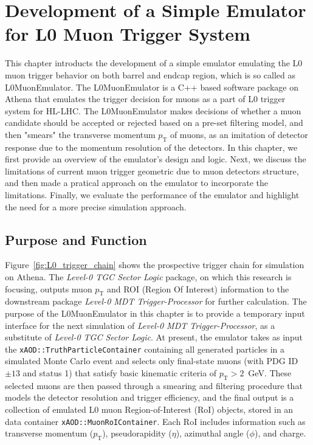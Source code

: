 \chapter{Development of a Simple Emulator for L0 Muon Trigger System} \label{ch:L0MuonEmulator}
This chapter introducts the development of a simple emulator emulating the L0 muon trigger behavior on both barrel and endcap region, which is so called as L0MuonEmulator. The L0MuonEmulator is a C++ based software package on Athena that emulates the trigger decision for muons as a part of L0 trigger system for HL-LHC. The L0MuonEmulator makes decisions of whether a muon candidate should be accepted or rejected based on a pre-set filtering model, and then "smears" the transverse momentum $p_\mathrm{T}$ of muons, as an imitation of detector response due to the momentum resolution of the detectors. In this chapter, we first provide an overview of the emulator's design and logic. Next, we discuss the limitations of current muon trigger geometric due to muon detectors structure, and then made a pratical approach on the emulator to incorporate the limitations. Finally, we evaluate the performance of the emulator and highlight the need for a more precise simulation approach.
\section{Purpose and Function} \label{sec:L0MuonPurpose}
Figure~\ref{fig:L0_trigger_chain} shows the prospective trigger chain for simulation on Athena. The \textit{Level-0 TGC Sector Logic} package, on which this research is focusing, outputs muon $p_\mathrm{T}$ and ROI (Region Of Interest) information to the downstream package \textit{Level-0 MDT Trigger-Processor} for further calculation. The purpose of the L0MuonEmulator in this chapter is to provide a temporary input interface for the next simulation of \textit{Level-0 MDT Trigger-Processor}, as a substitute of \textit{Level-0 TGC Sector Logic}. At present, the emulator takes as input the \texttt{xAOD::TruthParticleContainer} containing all generated particles in a simulated Monte Carlo event and selects only final-state muons (with PDG ID $\pm13$ and status 1) that satisfy basic kinematic criteria of $p_\mathrm{T} > 2$~GeV. These selected muons are then passed through a smearing and filtering procedure that models the detector resolution and trigger efficiency, and the final output is a collection of emulated L0 muon Region-of-Interest (RoI) objects, stored in an data container \texttt{xAOD::MuonRoIContainer}. Each RoI includes information such as transverse momentum ($p_\mathrm{T}$), pseudorapidity ($\eta$), azimuthal angle ($\phi$), and charge.

